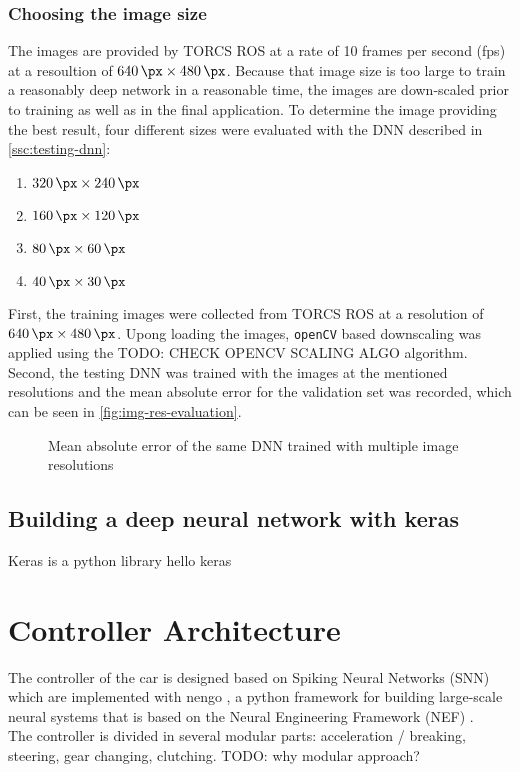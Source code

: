 \documentclass[10pt,a4paper,twoside,journal]{IEEEtran}
\begin{document}
\subsubsection{Choosing the image size}
The images are provided by TORCS ROS \cite{mirus_torcs} at a rate of 10 frames per second (fps) at a resoultion of $ \SI{640}{\px} \times \SI{480}{\px} $. Because that image size is too large
to train a reasonably deep network in a reasonable time, the images are down-scaled prior to training as well as in the final application. To determine the image providing the best result, four different sizes were evaluated with the DNN described in \autoref{ssc:testing-dnn}: 
\begin{enumerate}
	\item $ \SI{320}{\px} \times \SI{240}{\px} $
	\item $ \SI{160}{\px} \times \SI{120}{\px} $
	\item $ \SI{80}{\px} \times \SI{60}{\px} $
	\item $ \SI{40}{\px} \times \SI{30}{\px} $
\end{enumerate}
First, the training images were collected from TORCS ROS at a resolution of $ \SI{640}{\px}\times \SI{480}{\px}$. Upong loading the images, \texttt{openCV} based downscaling was applied using the TODO: CHECK OPENCV SCALING ALGO algorithm. Second, the testing DNN was trained with the images at the mentioned resolutions and the mean absolute error 
for the validation set was recorded, which can be seen in \autoref{fig:img-res-evaluation}.
\begin{figure}
	\centering
	\caption{Mean absolute error of the same DNN trained with multiple image resolutions}
	\label{fig:img-res-evaluation}
\end{figure}

\subsection{Building a deep neural network with keras}
\label{ssc:keras}
Keras is a python library 
hello keras \cite{Toshev_2014_CVPR}

\section{Controller Architecture}
\label{ssc:controller}

The controller of the car is designed based on Spiking Neural Networks (SNN) which are implemented with nengo \cite{nengo}, a python framework for building large-scale neural systems that is based on the Neural Engineering Framework (NEF) \cite{nef}. \\
The controller is divided in several modular parts: acceleration / breaking, steering, gear changing, clutching. TODO: why modular approach? \\
\end{document}
